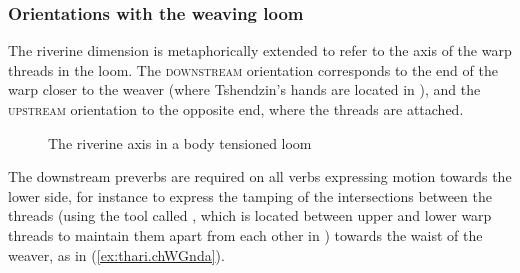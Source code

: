 

\subsubsection{Orientations with the weaving loom} \label{sec:orientation.loom}
The riverine dimension is metaphorically extended to refer to the axis of the warp threads in the loom. The \textsc{downstream} orientation corresponds to the end of the warp closer to the weaver (where Tshendzin's hands are located in ), and the \textsc{upstream} orientation to the opposite end, where the threads are attached.

\begin{figure} 
\caption{The riverine axis in a body tensioned loom}
\label{fig:loom1}
\end{figure}

The downstream preverbs are required on all verbs expressing motion towards the lower side, for instance to express the tamping of the intersections between the threads (using the tool called , which is located between upper and lower warp threads to maintain them apart from each other in ) towards the waist of the weaver, as in (\ref{ex:thari.chWGnda}).

